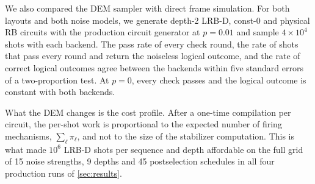 We also compared the DEM sampler with direct frame simulation. For both layouts and both noise models, we generate depth-2 LRB-D, const-0 and physical RB circuits with the production circuit generator at $p = 0.01$ and sample $4 \times 10^4$ shots with each backend. The pass rate of every check round, the rate of shots that pass every round and return the noiseless logical outcome, and the rate of correct logical outcomes agree between the backends within five standard errors of a two-proportion test. At $p = 0$, every check passes and the logical outcome is constant with both backends.

What the DEM changes is the cost profile. After a one-time compilation per circuit, the per-shot work is proportional to the expected number of firing mechanisms, $\sum_\ell \pi_\ell$, and not to the size of the stabilizer computation. This is what made $10^6$ LRB-D shots per sequence and depth affordable on the full grid of 15 noise strengths, 9 depths and 45 postselection schedules in all four production runs of \autoref{sec:results}.
